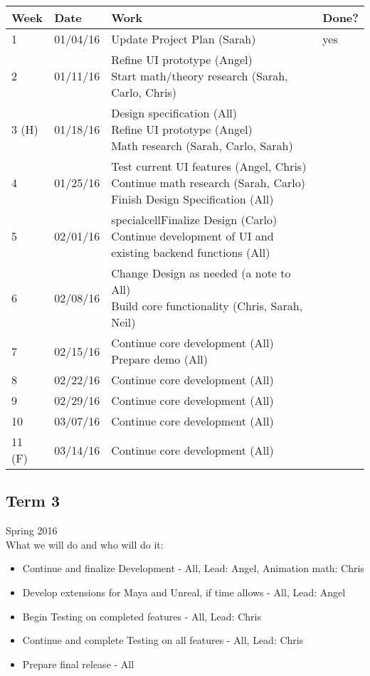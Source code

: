 \begin{table}[H]
\centering
\begin{tabular}{|l|l|l|l|}
\hline
Week 	& Date	 		& Work	 		& 	Done?	 \\ \hline
1		& 01/04/16	 	& Update Project Plan (Sarah)		& 	yes	 \\ \hline
2		& 01/11/16	 	& \specialcell{Refine UI prototype (Angel)  \\ Start math/theory research (Sarah, Carlo, Chris)}		& 			 \\ \hline
3 (H)	& 01/18/16	 	& \specialcell{Design specification (All) \\ Refine UI prototype (Angel) \\ Math research (Sarah, Carlo, Sarah)}		& 			 \\ \hline
4		& 01/25/16	 	& \specialcell{Test current UI features (Angel, Chris) \\ Continue math research (Sarah, Carlo) \\ Finish Design Specification (All)}		& 			 \\ \hline
5		& 02/01/16	 	& specialcell{Finalize Design (Carlo) \\ Continue development of UI and existing backend functions (All)}	& 			 \\ \hline
6		& 02/08/16	 	& \specialcell{Change Design as needed (a note to All) \\ Build core functionality (Chris, Sarah, Neil)}		& 			 \\ \hline
7		& 02/15/16	 	& \specialcell{Continue core development (All) \\ Prepare demo (All)}		& 			 \\ \hline
8		& 02/22/16	 	& Continue core development (All)		& 			 \\ \hline
9		& 02/29/16	 	& Continue core development (All)		& 			 \\ \hline
10		& 03/07/16	 	& Continue core development (All)		& 			 \\ \hline
11 (F)	& 03/14/16	 	& Continue core development (All)			& 			 \\ \hline
\end{tabular}
\end{table}

\subsection{Term 3}
Spring 2016 \\
What we will do and who will do it:
\begin{itemize}
	\item Continue and finalize Development - All, Lead: Angel, Animation math: Chris
	\item Develop extensions for Maya and Unreal, if time allows - All, Lead: Angel
	\item Begin Testing on completed features - All, Lead: Chris
	\item Continue and complete Testing on all features - All, Lead: Chris
	\item Prepare final release - All
\end{itemize}

